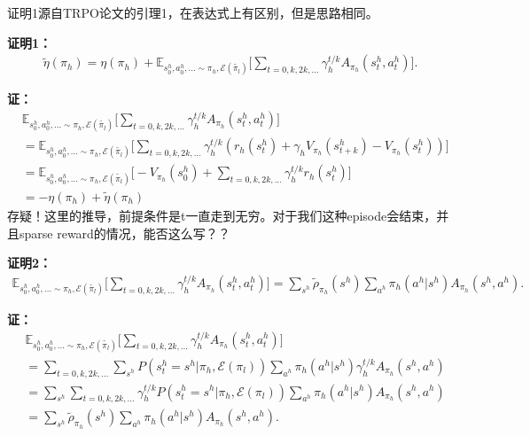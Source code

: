 \documentclass[degree=bachelor, tocarialchapter, pifootnote]{thuthesis}
\begin{document}
\backmatter




% 



%

\begin{appendix}

证明1源自TRPO论文的引理1，在表达式上有区别，但是思路相同。

\textbf{证明1：}
\begin{align}
  \tilde{\eta}(\pi_h) = \eta(\pi_h) + \mathbb{E}_{s_0^h, a_0^h, ... \sim \pi_h, \mathcal{E}(\tilde{\pi_l})}\Bigg[\sum_{t=0,k,2k,...} \gamma_h^{t/k} A_{\pi_h}(s_t^h, a_t^h)\Bigg].
  \label{eq:appendix1}
\end{align}

\textbf{证：}
\begin{align}
  &\mathbb{E}_{s_0^h, a_0^h, ... \sim \pi_h, \mathcal{E}(\tilde{\pi_l})}\Bigg[\sum_{t=0,k,2k,...} \gamma_h^{t/k} A_{\pi_h}(s_t^h, a_t^h)\Bigg]\\
  &= \mathbb{E}_{s_0^h, a_0^h, ... \sim \pi_h, \mathcal{E}(\tilde{\pi_l})}\Bigg[
      \sum_{t = 0, k, 2k, ...}\gamma_h^{t/k}(r_h(s_t^h)+\gamma_h V_{\pi_h}(s_{t+k}^h) - V_{\pi_h}(s_t^h))
      \Bigg]\\
  &= \mathbb{E}_{s_0^h, a_0^h, ... \sim \pi_h, \mathcal{E}(\tilde{\pi_l})}\Bigg[
      -V_{\pi_h}(s_0^h) + \sum_{t=0,k,2k,...} \gamma_h^{t/k} r_h(s_t^h)
      \Bigg]\\
  &= -\eta(\pi_h) + \tilde{\eta}(\pi_h)
\end{align}
存疑！这里的推导，前提条件是t一直走到无穷。对于我们这种episode会结束，并且sparse reward的情况，能否这么写？？

\textbf{证明2：}
\begin{align}
    \mathbb{E}_{s_0^h, a_0^h, ... \sim \pi_h, \mathcal{E}(\tilde{\pi_l})}\Bigg[\sum_{t=0,k,2k,...} \gamma_h^{t/k} A_{\pi_h}(s_t^h, a_t^h)\Bigg] = \sum_{s^h}\tilde{\rho}_{\pi_h}(s^h)\sum_{a^h}\pi_h(a^h|s^h)A_{\pi_h}(s^h,a^h).
\end{align}

\textbf{证：}
\begin{align}
  &\mathbb{E}_{s_0^h, a_0^h, ... \sim \pi_h, \mathcal{E}(\tilde{\pi_l})}\Bigg[\sum_{t=0,k,2k,...} \gamma_h^{t/k} A_{\pi_h}(s_t^h, a_t^h)\Bigg]\\
  &= \sum_{t = 0,k,2k,...} \sum_{s^h} P(s_t^h = s^h| \pi_h, \mathcal{E}(\pi_l)) \sum_{a^h} \pi_h(a^h|s^h) \gamma_h^{t/k} A_{\pi_h}(s^h, a^h)\\
  &= \sum_{s^h} \sum_{t = 0,k,2k,...} \gamma_h^{t/k} P(s_t^h = s^h|\pi_h, \mathcal{E}(\pi_l)) \sum_{a^h}\pi_h(a^h|s^h)A_{\pi_h}(s^h,a^h)\\
  &= \sum_{s^h}\tilde{\rho}_{\pi_h}(s^h)\sum_{a^h}\pi_h(a^h|s^h)A_{\pi_h}(s^h,a^h).
\end{align}


\end{appendix}
\end{document}
